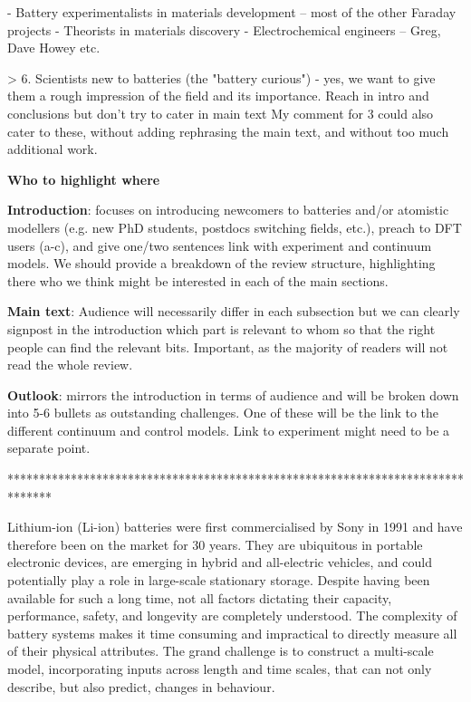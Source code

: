 \documentclass[../main.tex]{subfiles}
\begin{document}
- Battery experimentalists in materials development – most of the other Faraday projects
- Theorists in materials discovery
- Electrochemical engineers – Greg, Dave Howey etc.

> 6. Scientists new to batteries (the "battery curious") - yes, we want to give them a rough impression of the field and its importance. Reach in intro and conclusions but don’t try to cater in main text
My comment for 3 could also cater to these, without adding rephrasing the main text, and without too much additional work.

\textbf{Who to highlight where}

\textbf{Introduction}: focuses on introducing newcomers to batteries and/or atomistic modellers (e.g. new PhD students, postdocs switching fields, etc.), preach to DFT users (a-c), and give one/two sentences link with experiment and continuum models. We should provide a breakdown of the review structure, highlighting there who we think might be interested in each of the main sections.

\textbf{Main text}: Audience will necessarily differ in each subsection but we can clearly signpost in the introduction which part is relevant to whom so that the right people can find the relevant bits. Important, as the majority of readers will not read the whole review.

\textbf{Outlook}: mirrors the introduction in terms of audience and will be broken down into 5-6 bullets as outstanding challenges. One of these will be the link to the different continuum and control models. Link to experiment might need to be a separate point.


*******************************************************************************



Lithium-ion (Li-ion) batteries were first commercialised by Sony in 1991 and have therefore been on the market for 30 years. \cite{zeng2019commercialization} They are ubiquitous in portable electronic devices, are emerging in hybrid and all-electric vehicles, \cite{Goodenough2010} and could potentially play a role in large-scale stationary storage. \cite{kubiak2017calendar} Despite having been available for such a long time, not all factors dictating their capacity, performance, safety, and longevity are completely understood. The complexity of battery systems makes it time consuming and impractical to directly measure all of their physical attributes. The grand challenge is to construct a multi-scale model, incorporating inputs across length and time scales, that can not only describe, but also predict, changes in behaviour.
\end{document}
